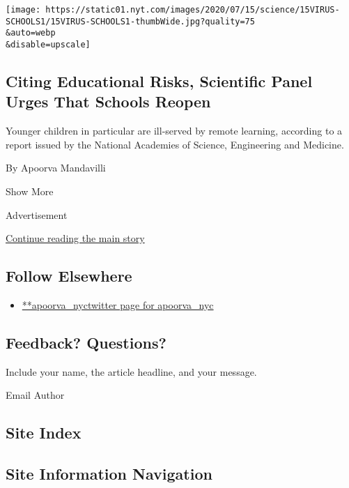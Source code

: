 \begin{enumerate}
  \texttt{[image: https://static01.nyt.com/images/2020/07/15/science/15VIRUS-SCHOOLS1/15VIRUS-SCHOOLS1-thumbWide.jpg?quality=75\\\&auto=webp\\\&disable=upscale]}

  \hypertarget{citing-educational-risks-scientific-panel-urges-that-schools-reopen}{%
  \subsection{Citing Educational Risks, Scientific Panel Urges That
  Schools
  Reopen}\label{citing-educational-risks-scientific-panel-urges-that-schools-reopen}}

  Younger children in particular are ill-served by remote learning,
  according to a report issued by the National Academies of Science,
  Engineering and Medicine.

  By Apoorva Mandavilli
\end{enumerate}

Show More

Advertisement

\protect\hyperlink{after-mid2}{Continue reading the main story}

\hypertarget{follow-elsewhere}{%
\subsection{Follow Elsewhere}\label{follow-elsewhere}}

\begin{itemize}
\tightlist
\item
  \href{https://twitter.com/apoorva_nyc}{**apoorva\_nyctwitter page for
  apoorva\_nyc}
\end{itemize}

\hypertarget{feedback-questions}{%
\subsection{Feedback? Questions?}\label{feedback-questions}}

Include your name, the article headline, and your message.

Email Author

\hypertarget{site-index}{%
\subsection{Site Index}\label{site-index}}

\hypertarget{site-information-navigation}{%
\subsection{Site Information
Navigation}\label{site-information-navigation}}

